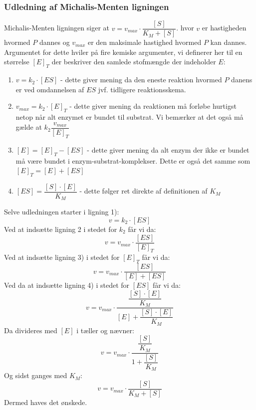 \subsubsection{Udledning af Michalis-Menten ligningen}
Michalis-Menten ligningen siger at $ v = v_{max} \cdot \dfrac{[S]}{K_M + [S]} $. hvor $v$ er hastigheden hvormed $P$ dannes og $v_{max}$ er den maksimale hastighed hvormed $P$ kan dannes.
Argumentet for dette hviler på fire kemiske argumenter, vi definerer her til en størrelse $[E]_T$ der beskriver den samlede stofmængde der indeholder $E$:
\begin{enumerate}
    \item $v = k_2 \cdot [ES]$ - dette giver mening da den eneste reaktion hvormed $P$ danens er ved omdannelsen af $ES$ jvf. tidligere reaktionsskema.
    \item $v_{max}=k_2\cdot [E]_T$ - dette giver mening da reaktionen må forløbe hurtigst netop når alt enzymet er bundet til substrat. 
    Vi bemærker at det også må gælde at $k_2  \dfrac{v_{max}}{[E]_T}$
    \item $[E] = [E]_T - [ES]$ - dette giver mening da alt enzym der ikke er bundet må være bundet i enzym-substrat-komplekser.
    Dette er også det samme som $[E]_T = [E] + [ES]$
    \item $[ES]=\dfrac{[S]\cdot [E]}{K_M}$ - dette følger ret direkte af definitionen af $K_M$
\end{enumerate}
Selve udledningen starter i ligning 1):
$$v = k_2 \cdot [ES]$$
Ved at indsætte ligning 2 i stedet for $k_2$ får vi da:
$$v = v_{max} \cdot \dfrac{[ES]}{[E]_T}$$
Ved at indsætte ligning 3) i stedet for $[E]_T$ får vi da:
$$v = v_{max} \cdot \dfrac{[ES]}{[E] + [ES]}$$
Ved da at indsætte ligning 4) i stedet for $[ES]$ får vi da:
$$v = v_{max} \cdot \dfrac{\dfrac{[S]\cdot [E]}{K_M}}{[E] + \dfrac{[S]\cdot [E]}{K_M}}$$
Da divideres med $[E]$ i tæller og nævner:
$$v = v_{max} \cdot \dfrac{\dfrac{[S]}{K_M}}{1 + \dfrac{[S]}{K_M}}$$
Og sidst ganges med $K_M$:
$$v = v_{max} \cdot \dfrac{[S]}{K_M + [S]}$$
Dermed haves det ønskede.

